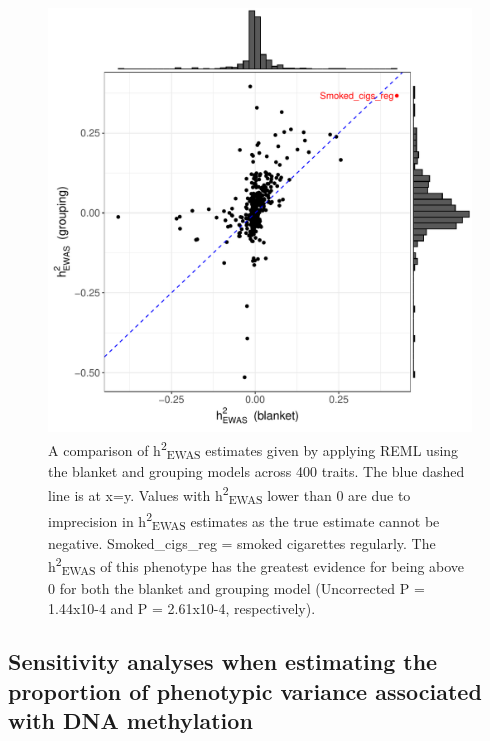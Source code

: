 \documentclass[11pt,oneside]{bristolthesis}
\begin{document}
\begin{figure}

{\centering \includegraphics[width=1\linewidth]{figure/05-h2ewas/model_m2_comparison} 

}

\caption{A comparison of h\textsuperscript{2}\textsubscript{EWAS} estimates given by applying REML using the blanket and grouping models across 400 traits. The blue dashed line is at x=y. Values with h\textsuperscript{2}\textsubscript{EWAS} lower than 0 are due to imprecision in h\textsuperscript{2}\textsubscript{EWAS} estimates as the true estimate cannot be negative. Smoked\_cigs\_reg = smoked cigarettes regularly. The h\textsuperscript{2}\textsubscript{EWAS} of this phenotype has the greatest evidence for being above 0 for both the blanket and grouping model (Uncorrected P = 1.44x10-4 and P = 2.61x10-4, respectively).}\label{fig:h2ewas-estimates}
\end{figure}
\hypertarget{results-sensitivity-analyses-05}{%
\subsection{Sensitivity analyses when estimating the proportion of phenotypic variance associated with DNA methylation}\label{results-sensitivity-analyses-05}}
\end{document}
